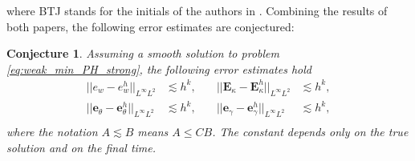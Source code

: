 \documentclass{ifacconf}
\newtheorem{conjecture}{Conjecture}
\begin{document}
where BTJ stands for the initials of the authors in \cite{becacheWave,becacheElas}.
Combining the results of both papers, the following error estimates are conjectured:
\begin{conjecture}
Assuming a smooth solution to problem \eqref{eq:weak_min_PH_strong}, the following error estimates hold 
\begin{equation}
\label{eq:errBEC}
\begin{aligned}
||e_w - e_w^h||_{L^{\infty} L^2} &\lesssim h^{k}, \\
||\bm{e}_\theta - \bm{e}_\theta^h||_{L^{\infty} L^2} &\lesssim h^{k}, \\
\end{aligned} \quad
\begin{aligned}
||\bm{E}_\kappa - \bm{E}_\kappa^h||_{L^{\infty} L^2} &\lesssim  h^{k}, \\
||\bm{e}_\gamma - \bm{e}_\gamma^ h||_{L^{\infty} L^2} &\lesssim  h^{k}, \\
\end{aligned} 
\end{equation}
where the notation $A \lesssim B$ means $A \le C B$. The constant depends only on the true solution and on the final time.
\end{conjecture}
\end{document}
